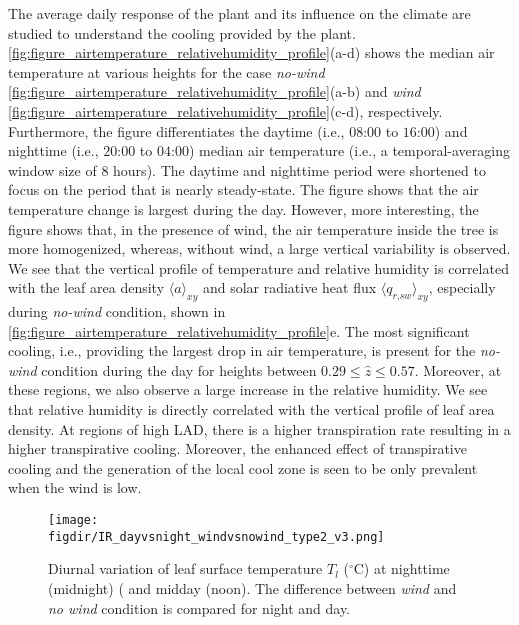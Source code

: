The average daily response of the plant and its influence on the climate are studied to understand the cooling provided by the plant. \cref{fig:figure_airtemperature_relativehumidity_profile}(a-d) shows the median air temperature at various heights for the case \textit{no-wind} \cref{fig:figure_airtemperature_relativehumidity_profile}(a-b) and \textit{wind} \cref{fig:figure_airtemperature_relativehumidity_profile}(c-d), respectively. Furthermore, the figure differentiates the daytime (i.e., $08$:$00$ to $16$:$00$) and nighttime (i.e., $20$:$00$ to $04$:$00$) median air temperature (i.e., a temporal-averaging window size of 8 hours). The daytime and nighttime period were shortened to focus on the period that is nearly steady-state. The figure shows that the air temperature change is largest during the day. However, more interesting, the figure shows that, in the presence of wind, the air temperature inside the tree is more homogenized, whereas, without wind, a large vertical variability is observed. We see that the vertical profile of temperature and relative humidity is correlated with the leaf area density $\langle a \rangle_{\textit{xy}}$ and solar radiative heat flux $\langle q_{\textit{r,sw}} \rangle_{\textit{xy}}$, especially during \textit{no-wind} condition, shown in \cref{fig:figure_airtemperature_relativehumidity_profile}e. The most significant cooling, i.e., providing the largest drop in air temperature, is present for the \textit{no-wind} condition during the day for heights between $0.29\le \hat{z} \le0.57$. Moreover, at these regions, we also observe a large increase in the relative humidity. We see that relative humidity is directly correlated with the vertical profile of leaf area density. At regions of high LAD, there is a higher transpiration rate resulting in a higher transpirative cooling. Moreover, the enhanced effect of transpirative cooling and the generation of the local cool zone is seen to be only prevalent when the wind is low. 

\begin{sidewaysfigure}[p]
	\centering 
	\texttt{[image: \\figdir/IR\_dayvsnight\_windvsnowind\_type2\_v3.png]}
	\caption{Diurnal variation of leaf surface temperature $T_l$ ($^{\circ}$C) at  nighttime (midnight) (  and midday (noon). The difference between \textit{wind} and \textit{no wind} condition is compared for  night and  day.}
	\label{fig:IR_dayvsnight_windvsnowind_type2_v2}
	
\end{sidewaysfigure}

